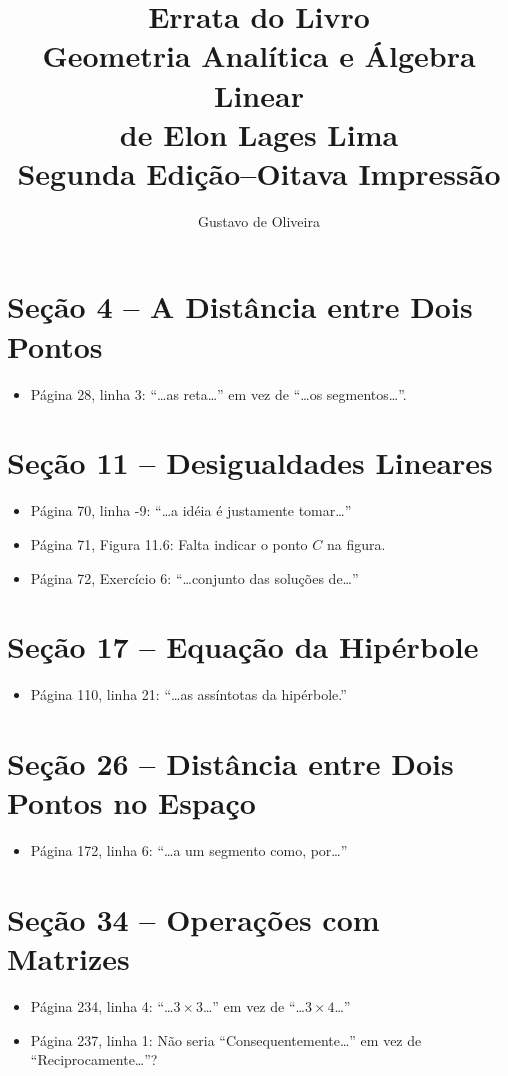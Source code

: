 \documentclass[a4paper,11pt]{article}
\title{Errata do Livro\\Geometria Analítica e Álgebra Linear\\de Elon Lages Lima\\Segunda Edição--Oitava Impressão}
\author{Gustavo de Oliveira}
\newcommand\onlyinsubfileone\maketitle
\newcommand\onlyinsubfiletwo\tableofcontents
\begin{document}
\onlyinsubfileone
\onlyinsubfiletwo

\section{Seção 4 -- A Distância entre Dois Pontos}

\begin{itemize}
  \item
    Página 28, linha 3: ``\dots as reta\dots'' em vez de ``\dots os segmentos\dots''.
\end{itemize}

\section{Seção 11 -- Desigualdades Lineares}

\begin{itemize}
  \item
    Página 70, linha -9: ``\dots a idéia é justamente tomar\dots''
  \item
    Página 71, Figura 11.6: Falta indicar o ponto $C$ na figura.
  \item
    Página 72, Exercício 6: ``\dots conjunto das soluções de\dots''
\end{itemize}

\section{Seção 17 -- Equação da Hipérbole}

\begin{itemize}
  \item
    Página 110, linha 21: ``\dots as assíntotas da hipérbole.''
\end{itemize}

\section{Seção 26 -- Distância entre Dois Pontos no Espaço}

\begin{itemize}
  \item
    Página 172, linha 6: ``\dots a um segmento como, por\dots''
\end{itemize}

\section{Seção 34 -- Operações com Matrizes}

\begin{itemize}
  \item
    Página 234, linha 4: ``\dots $3 \times 3$\dots'' em vez de ``\dots $3 \times 4$\dots''
  \item
    Página 237, linha 1: Não seria ``Consequentemente\dots'' em vez de ``Reciprocamente\dots''?
\end{itemize}
\end{document}
